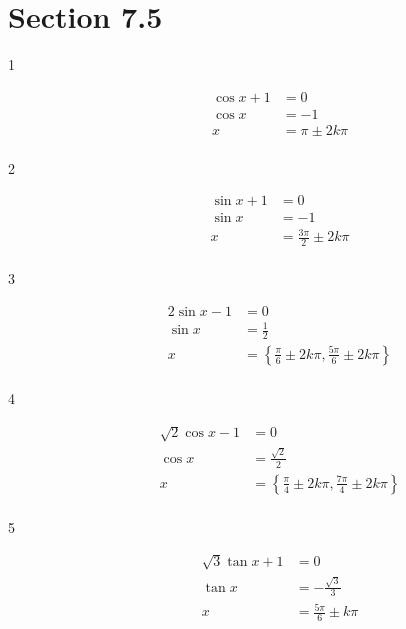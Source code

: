 \documentclass{exam}
\begin{document}
    \section{Section 7.5}
    \begin{description}

      \item[1] 
        \begin{align*}
          \cos x + 1 & = 0 \\
          \cos x     & = -1 \\
          x          & = \boxed{ \pi \pm 2 k \pi } \\
        \end{align*}

      \item[2] 
        \begin{align*}
          \sin x + 1 & = 0 \\
          \sin x     & = -1 \\
          x          & = \boxed{ \frac{3 \pi}{2} \pm 2 k \pi } \\
        \end{align*}

      \item[3] 
        \begin{align*}
          2 \sin x - 1 & = 0 \\
          \sin x       & = \frac{1}{2} \\
          x            & = \boxed{ \left\{ \frac{\pi}{6} \pm 2 k \pi, \frac{5 \pi}{6} \pm 2 k \pi \right\} } \\
        \end{align*}

      \item[4] 
        \begin{align*}
          \sqrt{2} \cos x - 1 & = 0 \\
          \cos x              & = \frac{\sqrt{2}}{2} \\
          x                   & = \boxed{ \left\{ \frac{\pi}{4} \pm 2 k \pi, \frac{7 \pi}{4} \pm 2 k \pi \right\} } \\
        \end{align*}

      \item[5] 
        \begin{align*}
          \sqrt{3} \tan x + 1 & = 0 \\
          \tan x              & = - \frac{\sqrt{3}}{3} \\
          x                   & = \boxed{ \frac{5 \pi}{6} \pm k \pi } \\
        \end{align*}


\end{description}
\end{document}
